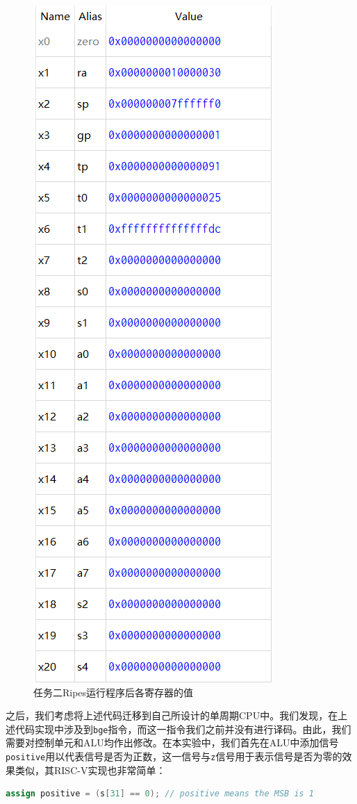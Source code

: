 \documentclass[a4paper,12pt]{article}
\begin{document}
    \begin{figure}[htbp]
        \centering
        \includegraphics[scale=0.5]{fig4.png}
        \caption{任务二Ripes运行程序后各寄存器的值}
        \label{fig:lab2_ripes}
    \end{figure}
    
    
    之后，我们考虑将上述代码迁移到自己所设计的单周期CPU中。我们发现，在上述代码实现中涉及到\verb|bge|指令，而这一指令我们之前并没有进行译码。由此，我们需要对控制单元和ALU均作出修改。在本实验中，我们首先在ALU中添加信号\verb|positive|用以代表信号是否为正数，这一信号与\verb|z|信号用于表示信号是否为零的效果类似，其RISC-V实现也非常简单：
\begin{lstlisting}[language=verilog]
assign positive = (s[31] == 0); // positive means the MSB is 1
\end{lstlisting}
\end{document}
